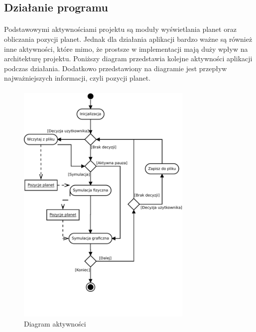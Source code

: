 \subsection{Działanie programu}\label{sub:dzialanie programu}
\paragraph{}

Podstawowymi aktywnościami projektu są moduły wyświetlania planet oraz obliczania pozycji planet. Jednak dla działania aplikacji bardzo ważne są również inne aktywności, które mimo, że prostsze w implementacji mają duży wpływ na architekturę projektu. Poniższy diagram przedstawia kolejne aktywności aplikacji podczas działania. Dodatkowo przedstawiony na diagramie jest przepływ najważniejszych informacji, czyli pozycji planet.

\paragraph{}

\begin{figure}[ht!]
	\centering
	\includegraphics[width=0.75\textwidth]{activity.pdf}
	\caption{Diagram aktywności}
	\label{fig:activity}
\end{figure}


